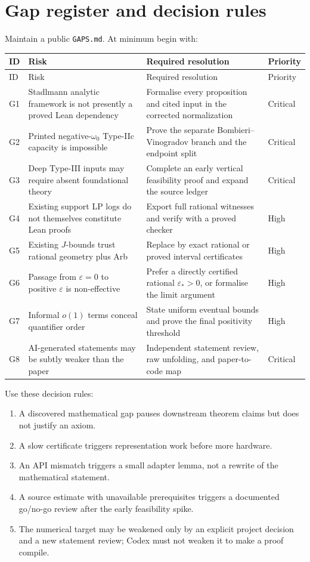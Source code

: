 \documentclass[11pt]{article}
\newcommand{\leanname}[1]{\texttt{#1}}
\begin{document}
\section{Gap register and decision rules}

Maintain a public \leanname{GAPS.md}.  At minimum begin with:

\begin{longtable}{p{}p{}p{}p{}}
\toprule
ID & Risk & Required resolution & Priority \\
\midrule
\endfirsthead
\toprule
ID & Risk & Required resolution & Priority \\
\midrule
\endhead
G1 & Stadlmann analytic framework is not presently a proved Lean dependency &
Formalise every proposition and cited input in the corrected normalization &
Critical \\
G2 & Printed negative-\(\omega_0\) Type-IIc capacity is impossible & Prove
the separate Bombieri--Vinogradov branch and the endpoint split & Critical \\
G3 & Deep Type-III inputs may require absent foundational theory & Complete an
early vertical feasibility proof and expand the source ledger & Critical \\
G4 & Existing support LP logs do not themselves constitute Lean proofs & Export
full rational witnesses and verify with a proved checker & High \\
G5 & Existing \(J\)-bounds trust rational geometry plus Arb & Replace by exact
rational or proved interval certificates & High \\
G6 & Passage from \(\varepsilon=0\) to positive \(\varepsilon\) is non-effective
& Prefer a directly certified rational \(\varepsilon_* >0\), or formalise the
limit argument & High \\
G7 & Informal \(o(1)\) terms conceal quantifier order & State uniform eventual
bounds and prove the final positivity threshold & High \\
G8 & AI-generated statements may be subtly weaker than the paper & Independent
statement review, raw unfolding, and paper-to-code map & Critical \\
\bottomrule
\end{longtable}

Use these decision rules:

\begin{enumerate}
\item A discovered mathematical gap pauses downstream theorem claims but does
not justify an axiom.
\item A slow certificate triggers representation work before more hardware.
\item An API mismatch triggers a small adapter lemma, not a rewrite of the
mathematical statement.
\item A source estimate with unavailable prerequisites triggers a documented
go/no-go review after the early feasibility spike.
\item The numerical target may be weakened only by an explicit project
decision and a new statement review; Codex must not weaken it to make a proof
compile.
\end{enumerate}
\end{document}
